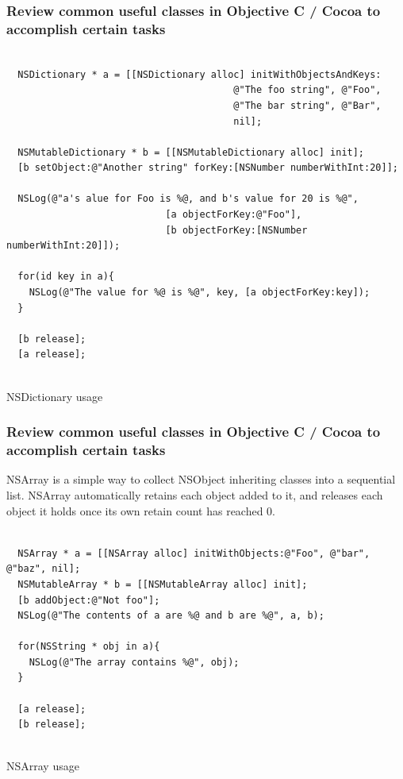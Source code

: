 \documentclass[10pt]{beamer}
\begin{document}
\begin{frame}[fragile]
  \frametitle{Review common useful classes in Objective C / Cocoa to accomplish certain tasks}
  \begin{listing}[H]
    \begin{verbatim}
  
  NSDictionary * a = [[NSDictionary alloc] initWithObjectsAndKeys:
                                        @"The foo string", @"Foo",
                                        @"The bar string", @"Bar",
                                        nil];
  
  NSMutableDictionary * b = [[NSMutableDictionary alloc] init];
  [b setObject:@"Another string" forKey:[NSNumber numberWithInt:20]];
  
  NSLog(@"a's alue for Foo is %@, and b's value for 20 is %@",
                            [a objectForKey:@"Foo"],
                            [b objectForKey:[NSNumber numberWithInt:20]]);
  
  for(id key in a){
    NSLog(@"The value for %@ is %@", key, [a objectForKey:key]);
  }
  
  [b release];
  [a release];
              
  \end{verbatim}
    \caption{NSDictionary usage}
    \label{listing:22}
  \end{listing}

\end{frame}

\begin{frame}[fragile]
  \frametitle{Review common useful classes in Objective C / Cocoa to accomplish certain tasks}
  NSArray is a simple way to collect NSObject inheriting classes into a sequential list.  NSArray automatically retains each object added to it, and releases each object it holds once its own retain count has reached 0.
\begin{listing}[H]
    \begin{verbatim}
  
  NSArray * a = [[NSArray alloc] initWithObjects:@"Foo", @"bar", @"baz", nil];
  NSMutableArray * b = [[NSMutableArray alloc] init];
  [b addObject:@"Not foo"];
  NSLog(@"The contents of a are %@ and b are %@", a, b);
  
  for(NSString * obj in a){
    NSLog(@"The array contains %@", obj);
  }
  
  [a release];
  [b release];
              
  \end{verbatim}
    \caption{NSArray usage}
    \label{listing:23}
  \end{listing}

\end{frame}
\end{document}
